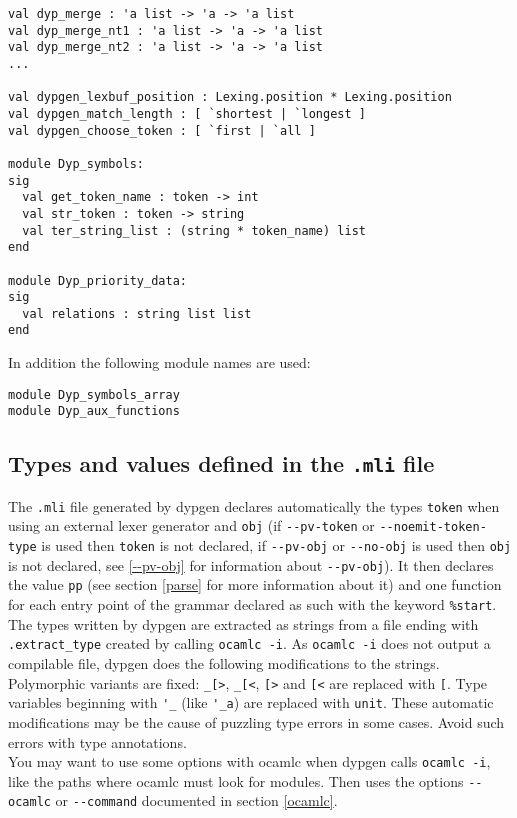\documentclass[12pt]{article}
\begin{document}
{\begin{verbatim}
val dyp_merge : 'a list -> 'a -> 'a list
val dyp_merge_nt1 : 'a list -> 'a -> 'a list
val dyp_merge_nt2 : 'a list -> 'a -> 'a list
...

val dypgen_lexbuf_position : Lexing.position * Lexing.position
val dypgen_match_length : [ `shortest | `longest ]
val dypgen_choose_token : [ `first | `all ]

module Dyp_symbols:
sig
  val get_token_name : token -> int
  val str_token : token -> string
  val ter_string_list : (string * token_name) list
end

module Dyp_priority_data:
sig
  val relations : string list list
end
\end{verbatim}

In addition the following module names are used:
\begin{verbatim}
module Dyp_symbols_array
module Dyp_aux_functions
\end{verbatim}

\subsection{Types and values defined in the \texttt{.mli} file}

The \verb|.mli| file generated by dypgen declares automatically the types \verb|token| when using an external lexer generator and \verb|obj| (if \verb|--pv-token| or \verb|--noemit-token-type| is used then \verb|token| is not declared, if \verb|--pv-obj| or \verb|--no-obj| is used then \verb|obj| is not declared, see \ref{--pv-obj} for information about \verb|--pv-obj|). It then declares the value \verb|pp| (see section \ref{parse} for more information about it) and one function for each entry point of the grammar declared as such with the keyword \verb|%start|.\\

The types written by dypgen are extracted as strings from a file ending with \verb|.extract_type| created by calling \verb|ocamlc -i|. As \verb|ocamlc -i| does not output a compilable file, dypgen does the following modifications to the strings. Polymorphic variants are fixed: \verb|_[>|, \verb|_[<|, \verb|[>| and \verb|[<| are replaced with \verb|[|. Type variables beginning with \verb|'_| (like \verb|'_a|) are replaced with \verb|unit|. These automatic modifications may be the cause of puzzling type errors in some cases. Avoid such errors with type annotations.\\

You may want to use some options with ocamlc when dypgen calls \verb|ocamlc -i|, like the paths where ocamlc must look for modules. Then uses the options \verb|--ocamlc| or \verb|--command| documented in section \ref{ocamlc}.

}
\end{document}
